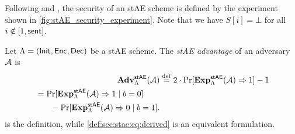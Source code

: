 Following \cite{AC:PatRisShr11} and \cite{C:JKSS12},
the security of an stAE scheme is defined by the experiment shown in \cref{fig:stAE_security_experiment}.
Note that we have $S[i] = \bot$ for all $i \notin [1, \mathsf{sent}]$.

\begin{definition}\label{def:stae:security}
Let $\Lambda = (\mathsf{Init}, \mathsf{Enc}, \mathsf{Dec})$ be a stAE scheme. 
The \emph{stAE advantage} of an adversary $\mathcal{A}$ is 
\begin{align}
	\mathbf{Adv}_{\Lambda}^{\mathsf{stAE}}(\mathcal{A}) 
		&\overset{\mathrm{def}}{=} 2 \cdot \Pr[ \mathbf{Exp}_{\Lambda}^{\mathsf{stAE}}(\mathcal{A}) \Rightarrow 1] - 1 \label{def:sec:stae:eq:definition}  \\ 
		\begin{split}
			&\hspace*{1.6pt}= \Pr[ \mathbf{Exp}_{\Lambda}^{\mathsf{stAE}}(\mathcal{A}) \Rightarrow 1 \mid b = 0] \\
			& \qquad - \Pr[ \mathbf{Exp}_{\Lambda}^{\mathsf{stAE}}(\mathcal{A}) \Rightarrow 0 \mid b = 1] . \label{def:sec:stae:eq:derived}
		\end{split}
\end{align}
 is the definition,
while \eqref{def:sec:stae:eq:derived} is an equivalent formulation.
\end{definition}



